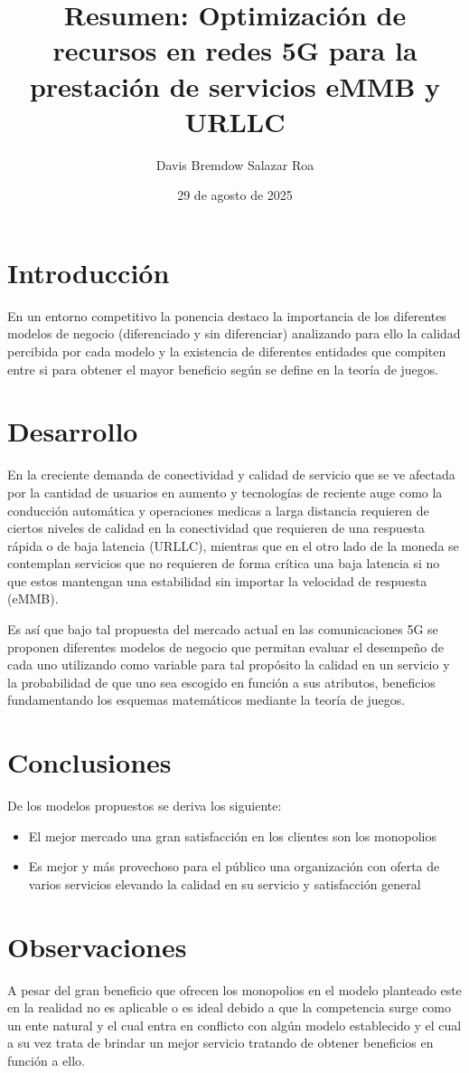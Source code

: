 \documentclass[12pt,a4paper]{article}
\title{Resumen: \textbf{Optimización de recursos en redes 5G para la prestación de servicios eMMB y URLLC}}
\author{Davis Bremdow Salazar Roa}
\date{29 de agosto de 2025}
\begin{document}
	
	\maketitle
	
	\section{Introducción}
	
	En un entorno competitivo la ponencia destaco la importancia de los diferentes modelos de negocio (diferenciado y sin diferenciar) analizando para ello la calidad percibida por cada modelo y la existencia de diferentes entidades que compiten entre si para obtener el mayor beneficio según se define en la teoría de juegos.
	
	\section{Desarrollo}
	
	En la creciente demanda de conectividad y calidad de servicio que se ve afectada por la cantidad de usuarios en aumento y tecnologías de reciente auge como la conducción automática y operaciones medicas a larga distancia requieren de ciertos niveles de calidad en la conectividad que requieren de una respuesta rápida o de baja latencia (URLLC), mientras que en el otro lado de la moneda se contemplan servicios que no requieren de forma crítica una baja latencia si no que estos mantengan una estabilidad sin importar la velocidad de respuesta (eMMB).
	
	Es así que bajo tal propuesta del mercado actual en las comunicaciones 5G se proponen diferentes modelos de negocio que permitan evaluar el desempeño de cada uno utilizando como variable para tal propósito la calidad en un servicio y la probabilidad de que uno sea escogido en función a sus atributos, beneficios fundamentando los esquemas matemáticos mediante la teoría de juegos.
	
	\section{Conclusiones}
	De los modelos propuestos se deriva los siguiente:
	\begin{itemize}
		\item El mejor mercado una gran satisfacción en los clientes son los monopolios
		\item Es mejor y más provechoso para el público una organización con oferta de varios servicios elevando la calidad en su servicio y satisfacción general
	\end{itemize}
	
	\section{Observaciones}
	A pesar del gran beneficio que ofrecen los monopolios en el modelo planteado este en la realidad no es aplicable o es ideal debido a que la competencia surge como un ente natural y el cual entra en conflicto con algún modelo establecido y el cual a su vez trata de brindar un mejor servicio tratando de obtener beneficios en función a ello.
\end{document}
